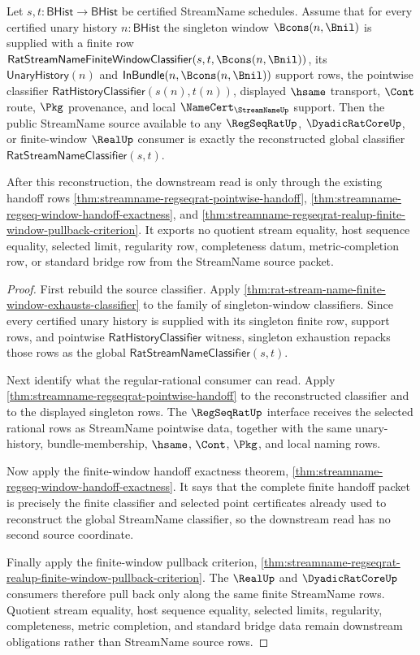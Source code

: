 \begin{theorem}
\label{thm:streamname-finite-window-global-classifier-exhaustion}
Let $s,t:\mathsf{BHist}\to\mathsf{BHist}$ be certified StreamName schedules.
Assume that for every certified unary history $n:\mathsf{BHist}$ the singleton
window $\Bcons(n,\Bnil)$ is supplied with a finite row
$\mathsf{RatStreamNameFiniteWindowClassifier}(s,t,\Bcons(n,\Bnil))$, its
$\mathsf{UnaryHistory}(n)$ and $\mathsf{InBundle}(n,\Bcons(n,\Bnil))$
support rows, the pointwise classifier
$\mathsf{RatHistoryClassifier}(s(n),t(n))$, displayed $\hsame$ transport,
$\Cont$ route, $\Pkg$ provenance, and local $\NameCert_{\StreamNameUp}$
support. Then the public StreamName source available to any
$\RegSeqRatUp$, $\DyadicRatCoreUp$, or finite-window $\RealUp$ consumer is
exactly the reconstructed global classifier
$\mathsf{RatStreamNameClassifier}(s,t)$.

After this reconstruction, the downstream read is only through the existing
handoff rows
\autoref{thm:streamname-regseqrat-pointwise-handoff},
\autoref{thm:streamname-regseq-window-handoff-exactness}, and
\autoref{thm:streamname-regseqrat-realup-finite-window-pullback-criterion}.
It exports no quotient stream equality, host sequence equality, selected
limit, regularity row, completeness datum, metric-completion row, or
standard bridge row from the StreamName source packet.
\end{theorem}
\begin{proof}
First rebuild the source classifier. Apply
\autoref{thm:rat-stream-name-finite-window-exhausts-classifier} to the
family of singleton-window classifiers. Since every certified unary history
is supplied with its singleton finite row, support rows, and pointwise
$\mathsf{RatHistoryClassifier}$ witness, singleton exhaustion repacks those
rows as the global $\mathsf{RatStreamNameClassifier}(s,t)$.

Next identify what the regular-rational consumer can read. Apply
\autoref{thm:streamname-regseqrat-pointwise-handoff} to the reconstructed
classifier and to the displayed singleton rows. The $\RegSeqRatUp$ interface
receives the selected rational rows as StreamName pointwise data, together
with the same unary-history, bundle-membership, $\hsame$, $\Cont$, $\Pkg$,
and local naming rows.

Now apply the finite-window handoff exactness theorem,
\autoref{thm:streamname-regseq-window-handoff-exactness}. It says that the
complete finite handoff packet is precisely the finite classifier and selected
point certificates already used to reconstruct the global StreamName
classifier, so the downstream read has no second source coordinate.

Finally apply the finite-window pullback criterion,
\autoref{thm:streamname-regseqrat-realup-finite-window-pullback-criterion}.
The $\RealUp$ and $\DyadicRatCoreUp$ consumers therefore pull back only along
the same finite StreamName rows. Quotient stream equality, host sequence
equality, selected limits, regularity, completeness, metric completion, and
standard bridge data remain downstream obligations rather than StreamName
source rows.
\end{proof}
